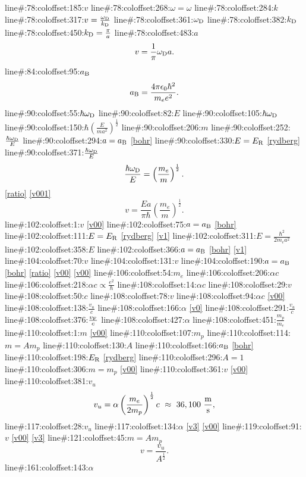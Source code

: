 line#:78:coloffset:185:$v$
line#:78:coloffset:268:$\omega=\omega$
line#:78:coloffset:284:$k$
line#:78:coloffset:317:$v=\frac{\omega_{\rm D}}{k_{\rm D}}$
line#:78:coloffset:361:$\omega_{\rm D}$
line#:78:coloffset:382:$k_{\rm D}$
line#:78:coloffset:450:$k_{\rm D}=\frac{\pi}{a}$
line#:78:coloffset:483:$a$
\begin{equation}
v=\frac{1}{\pi}\omega_{\rm D}a.
\label{v001}
\end{equation}
line#:84:coloffset:95:$a_{\rm B}$
\begin{equation}
a_{\rm B}=\frac{4\pi\epsilon_0\hbar^2}{m_e e^2}.
\label{bohr}
\end{equation}
line#:90:coloffset:55:$\hbar\omega_{\rm D}$
line#:90:coloffset:82:$E$
line#:90:coloffset:105:$\hbar\omega_{\rm D}$
line#:90:coloffset:150:$\hbar\left(\frac{E}{ma^2}\right)^{\frac{1}{2}}$
line#:90:coloffset:206:$m$
line#:90:coloffset:252:$\frac{\hbar\omega_{\rm D}}{E}$
line#:90:coloffset:294:$a=a_{\rm B}$
\ref{bohr}
line#:90:coloffset:330:$E=E_{\rm R}$
\ref{rydberg}
line#:90:coloffset:371:$\frac{\hbar\omega_{\rm D}}{E}$
\begin{equation}
\frac{\hbar\omega_{\rm D}}{E}=\left(\frac{m_e}{m}\right)^{\frac{1}{2}}.
\label{ratio}
\end{equation}
\ref{ratio}
\ref{v001}
\begin{equation}
v=\frac{Ea}{\pi\hbar}\left(\frac{m_e}{m}\right)^{\frac{1}{2}}.
\label{v1}
\end{equation}
line#:102:coloffset:1:$v$
\ref{v00}
line#:102:coloffset:75:$a=a_{\rm B}$
\ref{bohr}
line#:102:coloffset:111:$E=E_{\rm R}$
\ref{rydberg}
\ref{v1}
line#:102:coloffset:311:$E=\frac{\hbar^2}{2m_ea^2}$
line#:102:coloffset:358:$E$
line#:102:coloffset:366:$a=a_{\rm B}$
\ref{bohr}
\ref{v1}
line#:104:coloffset:70:$v$
line#:104:coloffset:131:$v$
line#:104:coloffset:190:$a=a_{\rm B}$
\ref{bohr}
\ref{ratio}
\ref{v00}
\ref{v00}
line#:106:coloffset:54:$m_e$
line#:106:coloffset:206:$\alpha c$
line#:106:coloffset:218:$\alpha c\propto\frac{e^2}{\hbar}$
line#:108:coloffset:14:$\alpha c$
line#:108:coloffset:29:$v$
line#:108:coloffset:50:$c$
line#:108:coloffset:78:$v$
line#:108:coloffset:94:$\alpha c$
\ref{v00}
line#:108:coloffset:138:$\frac{v_u}{c}$
line#:108:coloffset:166:$\alpha$
\ref{v0}
line#:108:coloffset:291:$\frac{v_u}{c}$
line#:108:coloffset:376:$\frac{v_{\rm F}}{c}$
line#:108:coloffset:427:$\alpha$
line#:108:coloffset:451:$\frac{m_p}{m_e}$
line#:110:coloffset:1:$m$
\ref{v00}
line#:110:coloffset:107:$m_p$
line#:110:coloffset:114:$m=Am_p$
line#:110:coloffset:130:$A$
line#:110:coloffset:166:$a_{\rm B}$
\ref{bohr}
line#:110:coloffset:198:$E_{\rm R}$
\ref{rydberg}
line#:110:coloffset:296:$A=1$
line#:110:coloffset:306:$m=m_p$
\ref{v00}
line#:110:coloffset:361:$v$
\ref{v00}
line#:110:coloffset:381:$v_u$
\begin{equation}
v_u=\alpha\left(\frac{m_e}{2m_p}\right)^{\frac{1}{2}}c~\approx~36,100~\frac{\rm m}{\rm s},
\label{v3}
\end{equation}
line#:117:coloffset:28:$v_u$
line#:117:coloffset:134:$\alpha$
\ref{v3}
\ref{v00}
line#:119:coloffset:91:$v$
\ref{v00}
\ref{v3}
line#:121:coloffset:45:$m=Am_p$
\begin{equation}
v=\frac{v_u}{A^\frac{1}{2}}.
\label{a}
\end{equation}
line#:161:coloffset:143:$\alpha$

